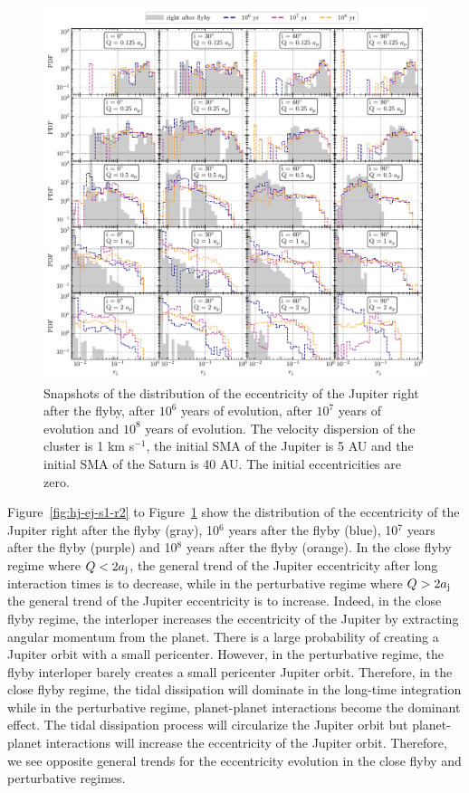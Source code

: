 \documentclass[twocolumn]{aastex63}
\newcommand*\fgr[1]{Figure~\ref{#1}}
\begin{document}
\begin{figure}
    \includegraphics[width=\textwidth]{figs/migration_ej-r8.pdf}
    \caption{Snapshots of the distribution of the eccentricity of the Jupiter right after the flyby, after $10^6$ years of evolution, after $10^7$ years of evolution and $10^8$ years of evolution. The velocity dispersion of the cluster is 1 km s$^{-1}$, the initial SMA of the Jupiter is 5 AU and the initial SMA of the Saturn is 40 AU. The initial eccentricities are zero.}
    \label{fig:hj-ej-s1-r8}
\end{figure}

\fgr{fig:hj-ej-s1-r2} to \fgr{fig:hj-ej-s1-r8} show the distribution of the eccentricity of the Jupiter right after the flyby (gray), 10$^6$ years after the flyby (blue), 10$^7$ years after the flyby (purple) and 10$^8$ years after the flyby (orange). In the close flyby regime where $Q<2a_{\rm j}$, the general trend of the Jupiter eccentricity after long interaction times is to decrease, while in the perturbative regime where $Q>2a_{\rm j}$ the general trend of the Jupiter eccentricity is to increase. Indeed, in the close flyby regime, the interloper increases the eccentricity of the Jupiter by extracting angular momentum from the planet. There is a large probability of creating a Jupiter orbit with a small pericenter. However, in the perturbative regime, the flyby interloper barely creates a small pericenter Jupiter orbit. Therefore, in the close flyby regime, the tidal dissipation will dominate in the long-time integration while in the perturbative regime, planet-planet interactions become the dominant effect. The tidal dissipation process will circularize the Jupiter orbit but planet-planet interactions will increase the eccentricity of the Jupiter orbit. Therefore, we see opposite general trends for the eccentricity evolution in the close flyby and perturbative regimes. 
\end{document}
